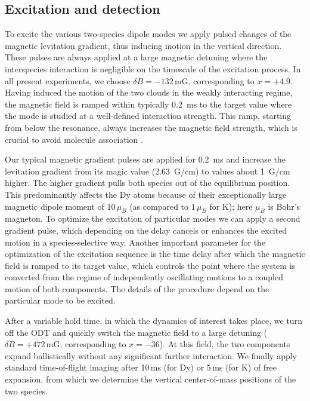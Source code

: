 \subsection{Excitation and detection}\label{ssec:excitedetect}

To excite the various two-species dipole modes we apply pulsed changes of the magnetic levitation gradient, thus inducing motion in the vertical direction. These pulses are always applied at a large magnetic detuning 
where the interspecies interaction 
is negligible on the timescale of the excitation process. In all present experiments, we choose {$\delta B = -132$\,mG}, corresponding to $x=+4.9$.
Having induced the motion of the two clouds in the weakly interacting regime, the magnetic field is ramped within typically \SI{0.2}{ms} to the target value where the mode is studied at a well-defined interaction strength. This ramp, starting from below the resonance, always increases the magnetic field strength, which is crucial to avoid molecule association \cite{Chin2010fri, Soave2023otf}.

Our typical magnetic gradient pulses are applied for \SI{0.2}{ms} and increase the levitation gradient from its magic value (\SI{2.63}{G/cm}) to values about \SI{1}{G/cm} higher. The higher gradient pulls both species out of the equilibrium position. This predominantly affects the Dy atoms because of their exceptionally large magnetic dipole moment of $10\,\mu_B$ (as compared to $1\,\mu_B$ for K); here $\mu_B$ is Bohr's magneton.
To optimize the excitation of particular modes we can apply a second gradient pulse, which depending on the delay cancels or enhances the excited motion in a species-selective way. Another important parameter for the optimization of the excitation sequence is the time delay after which the magnetic field is ramped to its target value, which controls the point where the system is converted from the regime of independently oscillating motions to a coupled motion of both components. The details of the procedure depend on the particular mode to be excited. 

After a variable hold time, in which the dynamics of interest takes place, we turn off the ODT and quickly switch the magnetic field to a large detuning ($\delta B = +472\,$mG, corresponding to $x = -36$). At this field, the two components expand ballistically without any significant further interaction. We finally apply standard time-of-flight imaging after 10\,ms (for Dy) or 5\,ms (for K) of free expansion, from which we determine the vertical center-of-mass positions of the two species.

